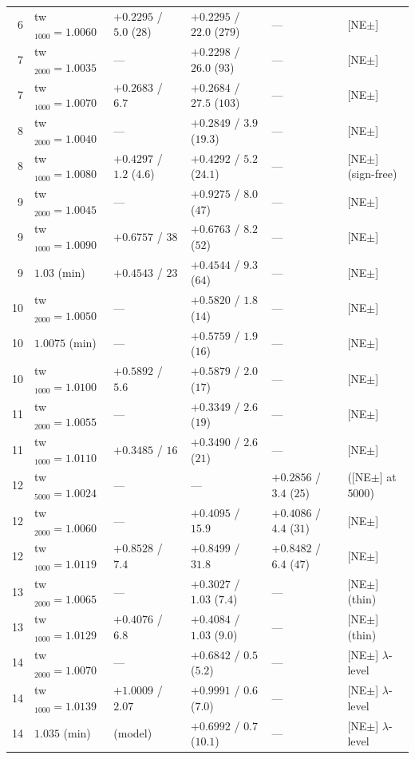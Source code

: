 \documentclass[aps,prl,onecolumn,superscriptaddress,nofootinbib]{revtex4-2}
\begin{document}
\begin{table}[!htbp]
\begin{ruledtabular}
\begin{tabular}{rlllll}
6 & tw$_{1000}=1.0060$ & $+0.2295$ / $5.0$ ($28$) & $+0.2295$ / $22.0$ ($279$) & --- & [NE$\pm$]\\
7 & tw$_{2000}=1.0035$ & --- & $+0.2298$ / $26.0$ ($93$) & --- & [NE$\pm$]\\
7 & tw$_{1000}=1.0070$ & $+0.2683$ / $6.7$ & $+0.2684$ / $27.5$ ($103$) & --- & [NE$\pm$]\\
8 & tw$_{2000}=1.0040$ & --- & $+0.2849$ / $3.9$ ($19.3$) & --- & [NE$\pm$]\\
8 & tw$_{1000}=1.0080$ & $+0.4297$ / $1.2$ ($4.6$) & $+0.4292$ / $5.2$ ($24.1$) & --- & [NE$\pm$] (sign-free)\\
9 & tw$_{2000}=1.0045$ & --- & $+0.9275$ / $8.0$ ($47$) & --- & [NE$\pm$]\\
9 & tw$_{1000}=1.0090$ & $+0.6757$ / $38$ & $+0.6763$ / $8.2$ ($52$) & --- & [NE$\pm$]\\
9 & $1.03$ (min) & $+0.4543$ / $23$ & $+0.4544$ / $9.3$ ($64$) & --- & [NE$\pm$]\\
10 & tw$_{2000}=1.0050$ & --- & $+0.5820$ / $1.8$ ($14$) & --- & [NE$\pm$]\\
10 & $1.0075$ (min) & --- & $+0.5759$ / $1.9$ ($16$) & --- & [NE$\pm$]\\
10 & tw$_{1000}=1.0100$ & $+0.5892$ / $5.6$ & $+0.5879$ / $2.0$ ($17$) & --- & [NE$\pm$]\\
11 & tw$_{2000}=1.0055$ & --- & $+0.3349$ / $2.6$ ($19$) & --- & [NE$\pm$]\\
11 & tw$_{1000}=1.0110$ & $+0.3485$ / $16$ & $+0.3490$ / $2.6$ ($21$) & --- & [NE$\pm$]\\
12 & tw$_{5000}=1.0024$ & --- & --- & $+0.2856$ / $3.4$ ($25$) & ([NE$\pm$] at $5000$)\\
12 & tw$_{2000}=1.0060$ & --- & $+0.4095$ / $15.9$ & $+0.4086$ / $4.4$ ($31$) & [NE$\pm$]\\
12 & tw$_{1000}=1.0119$ & $+0.8528$ / $7.4$ & $+0.8499$ / $31.8$ & $+0.8482$ / $6.4$ ($47$) & [NE$\pm$]\\
13 & tw$_{2000}=1.0065$ & --- & $+0.3027$ / $1.03$ ($7.4$) & --- & [NE$\pm$] (thin)\\
13 & tw$_{1000}=1.0129$ & $+0.4076$ / $6.8$ & $+0.4084$ / $1.03$ ($9.0$) & --- & [NE$\pm$] (thin)\\
14 & tw$_{2000}=1.0070$ & --- & $+0.6842$ / $0.5$ ($5.2$) & --- & [NE$\pm$] $\lambda$-level\\
14 & tw$_{1000}=1.0139$ & $+1.0009$ / $2.07$ & $+0.9991$ / $0.6$ ($7.0$) & --- & [NE$\pm$] $\lambda$-level\\
14 & $1.035$ (min) & (model) & $+0.6992$ / $0.7$ ($10.1$) & --- & [NE$\pm$] $\lambda$-level\\

\end{tabular}
\end{ruledtabular}
\end{table}
\end{document}
